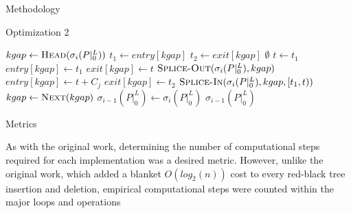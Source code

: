 \documentclass{article}
\begin{document}
\begin{section}{Methodology}
\begin{subsection}{Optimization 2}
\begin{algorithm}[H]
\begin{algorithmic}[2]
            \State \begingroup\color{red}$kgap \gets \Call{Head}{\sigma_{i}(P|_{0}^{L})}$\endgroup
            \State $t_{1} \gets entry[kgap]$
            \State $t_{2} \gets exit[kgap]$
                \State \Return $\emptyset$
              \EndIf
                \State $t \gets t_{1}$
              \EndIf
                \begingroup\color{red}
                    \State $entry[kgap] \gets t_{1}$
                    \State $exit[kgap] \gets t$
                  \Else
                    \State $\Call{Splice-Out}{\sigma_{i}(P|_{0}^{L}), kgap}$
                  \EndIf
                    \ExitWhile
                  \EndIf
                \EndIf
                \endgroup
                  \State \begingroup\color{red}$entry[kgap] \gets t + C_{j}$\endgroup
                  \State \begingroup\color{red}$exit[kgap] \gets t_{2}$\endgroup
                    \State \begingroup\color{red}$\Call{Splice-In}{\sigma_{i}(P|_{0}^{L}), kgap, [t_{1},t)}$\endgroup
                  \EndIf
                  \ExitWhile
                \EndIf
              \EndIf
                \State \begingroup\color{red}$kgap \gets \Call{Next}{kgap}$\endgroup
              \EndIf
            \EndWhile
          \EndFor
          \State $\sigma_{i-1}(P|_{0}^{L}) \gets \sigma_{i}(P|_{0}^{L})$
          \State \Return $\sigma_{i-1}(P|_{0}^{L})$
        \EndFunction
      \end{algorithmic}
      \end{algorithm}
  \end{subsection}
  \begin{subsection}{Metrics}
    \begin{paragraph}{}
      As with the original work, determining the number of computational steps required for
      each implementation was a desired metric. However, unlike the original work, which
      added a blanket $O(log_{2}(n))$ cost to every red-black tree insertion and deletion\autocite[14]{BelwalCheng},
      empirical computational steps were counted within the major loops and operations

\end{paragraph}
\end{subsection}
\end{section}
\end{document}
